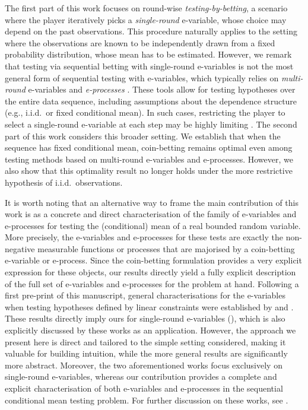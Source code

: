 \documentclass[3p, authoryear, 10pt]{elsarticle}%
\begin{document}
The first part of this work focuses on  round-wise \emph{testing-by-betting}, a scenario where the player iteratively picks a \emph{single-round} e-variable, whose choice may depend on the past observations. This procedure naturally applies to the setting where the observations are known to be independently drawn from a fixed probability distribution, whose mean has to be estimated. However, we remark that testing via sequential betting with single-round e-variables is not the most general form of sequential testing with e-variables, which typically relies on \emph{multi-round} e-variables and \emph{e-processes} \citep{shafer2021testing, koolen2022log, ramdas22testing, ramdas2024hypothesis}. These tools allow for testing hypotheses over the entire data sequence, including assumptions about the dependence structure (e.g., i.i.d.~or fixed conditional mean). In such cases, restricting the player to select a single-round e-variable at each step may be highly limiting \citep{koolen2022log, ramdas22testing}. The second part of this work considers this broader setting. We establish that when the sequence has fixed conditional mean, coin-betting remains optimal even among testing methods based on multi-round e-variables and e-processes. However, we also show that this optimality result no longer holds under the more restrictive hypothesis of i.i.d.~observations.

It is worth noting that an alternative way to frame the main contribution of this work is as a concrete and direct characterisation of the family of e-variables and e-processes for testing the (conditional) mean of a real bounded random variable. More precisely, the e-variables and e-processes for these tests are exactly the non-negative measurable functions or processes that are majorised by a coin-betting e-variable or e-process. Since the coin-betting formulation provides a very explicit expression for these objects, our results directly yield a fully explicit description of the full set of e-variables and e-processes for the problem at hand. Following  a first pre-print of this manuscript, general characterisations for the e-variables when testing hypotheses defined by linear constraints were established by \cite{clerico24optimal} and \cite{larsson2025evariables}. These results directly imply ours  for single-round e-variables (), which is also explicitly discussed by these works as an application. However, the approach we present here is direct and tailored to the simple setting considered, making it valuable for building intuition, while the more general results are significantly more abstract. Moreover, the two aforementioned works focus exclusively on single-round e-variables, whereas our contribution provides a complete and  explicit characterisation of both e-variables and e-processes in the sequential  conditional mean testing problem. For further discussion on these works, see .
\end{document}

